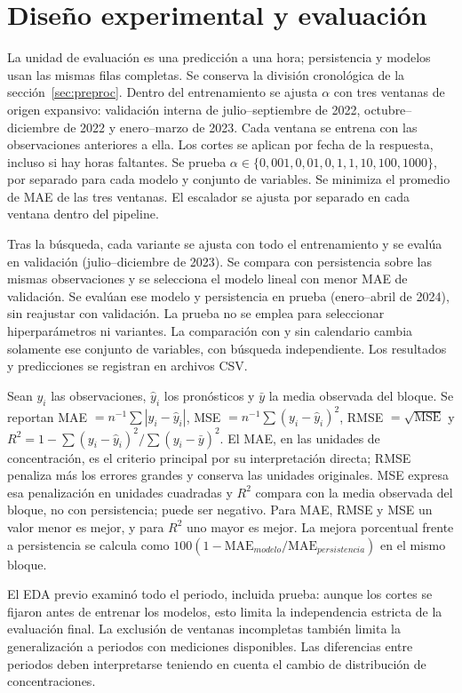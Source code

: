 \section{Diseño experimental y evaluación}
\label{sec:diseno}
La unidad de evaluación es una predicción a una hora; persistencia y modelos usan las mismas filas completas. Se conserva la división cronológica de la sección~\ref{sec:preproc}. Dentro del entrenamiento se ajusta $\alpha$ con tres ventanas de origen expansivo: validación interna de julio--septiembre de 2022, octubre--diciembre de 2022 y enero--marzo de 2023. Cada ventana se entrena con las observaciones anteriores a ella. Los cortes se aplican por fecha de la respuesta, incluso si hay horas faltantes. Se prueba $\alpha\in\{0{,}001,0{,}01,0{,}1,1,10,100,1000\}$, por separado para cada modelo y conjunto de variables. Se minimiza el promedio de MAE de las tres ventanas. El escalador se ajusta por separado en cada ventana dentro del pipeline.

Tras la búsqueda, cada variante se ajusta con todo el entrenamiento y se evalúa en validación (julio--diciembre de 2023). Se compara con persistencia sobre las mismas observaciones y se selecciona el modelo lineal con menor MAE de validación. Se evalúan ese modelo y persistencia en prueba (enero--abril de 2024), sin reajustar con validación. La prueba no se emplea para seleccionar hiperparámetros ni variantes. La comparación con y sin calendario cambia solamente ese conjunto de variables, con búsqueda independiente. Los resultados y predicciones se registran en archivos CSV.

Sean $y_i$ las observaciones, $\hat y_i$ los pronósticos y $\bar y$ la media observada del bloque. Se reportan MAE $=n^{-1}\sum |y_i-\hat y_i|$, MSE $=n^{-1}\sum(y_i-\hat y_i)^2$, RMSE $=\sqrt{\mathrm{MSE}}$ y $R^2=1-\sum(y_i-\hat y_i)^2/\sum(y_i-\bar y)^2$. El MAE, en las unidades de concentración, es el criterio principal por su interpretación directa; RMSE penaliza más los errores grandes y conserva las unidades originales. MSE expresa esa penalización en unidades cuadradas y $R^2$ compara con la media observada del bloque, no con persistencia; puede ser negativo. Para MAE, RMSE y MSE un valor menor es mejor, y para $R^2$ uno mayor es mejor. La mejora porcentual frente a persistencia se calcula como $100(1-\mathrm{MAE}_{modelo}/\mathrm{MAE}_{persistencia})$ en el mismo bloque.

El EDA previo examinó todo el periodo, incluida prueba: aunque los cortes se fijaron antes de entrenar los modelos, esto limita la independencia estricta de la evaluación final. La exclusión de ventanas incompletas también limita la generalización a periodos con mediciones disponibles. Las diferencias entre periodos deben interpretarse teniendo en cuenta el cambio de distribución de concentraciones.
